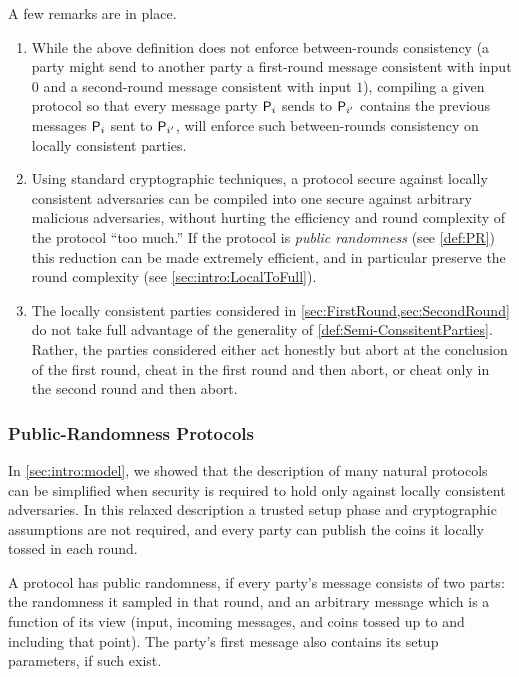 A few remarks are in place.
\begin{enumerate}
	\item While the above definition does not enforce between-rounds consistency (a party might send to another party a first-round message consistent with input $0$ and a second-round message consistent with input $1$), compiling a given protocol so that every message party $\mathsf{P}_{i}$ sends to $\mathsf{P}_{i'}$ contains the previous messages $\mathsf{P}_{i}$ sent to $\mathsf{P}_{i'}$, will enforce such between-rounds consistency on locally consistent parties.
	
	\item Using standard cryptographic techniques, a protocol secure against locally consistent adversaries can be compiled into one secure against arbitrary malicious adversaries, without hurting the efficiency and round complexity of the protocol ``too much.'' If the protocol is \emph{public randomness} (see \cref{def:PR}) this reduction can be made extremely efficient, and in particular preserve the round complexity (see \cref{sec:intro:LocalToFull}).
	
	\item The locally consistent parties considered in \cref{sec:FirstRound,sec:SecondRound} do not take full advantage of the generality of \cref{def:Semi-ConssitentParties}. Rather, the parties considered either act honestly but abort at the conclusion of the first round, cheat in the first round and then abort, or cheat only in the second round and then abort.
\end{enumerate}

\subsubsection{Public-Randomness Protocols}\label{sec:OurResults:PR}
In \cref{sec:intro:model}, we showed that the description of many natural protocols can be simplified when security is required to hold only against locally consistent adversaries. In this relaxed description a trusted setup phase and cryptographic assumptions are not required, and every party can publish the coins it locally tossed in each round.

\begin{definition}\label{def:PR}
A protocol has {\sf public randomness}, if every party's message consists of two parts: the randomness it sampled in that round, and an arbitrary message which is a function of its view (input, incoming messages, and coins tossed up to and including that point). The party's first message also contains its setup parameters, if such exist.
\end{definition}

